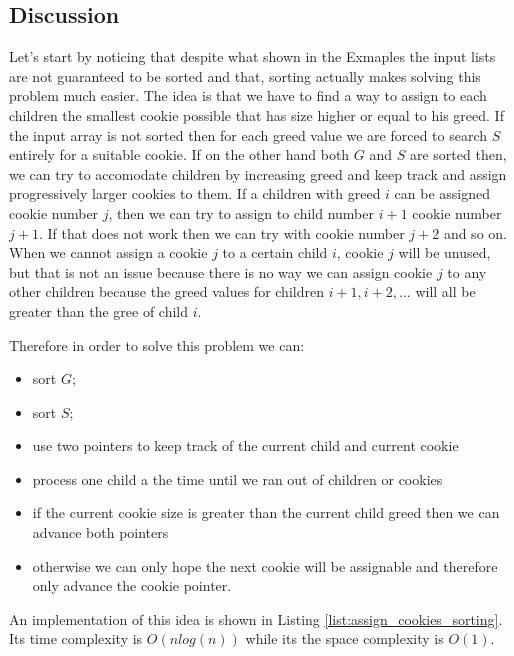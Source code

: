 \subsection{Discussion}
Let's start by noticing that despite what shown in the Exmaples the input lists are not guaranteed to be sorted and that, sorting actually makes solving this problem much easier.
The idea is that we have to find a way to assign to each children the smallest cookie possible that has size higher or equal to his greed. If the input array is not sorted then for each greed value we are forced to search $S$ entirely for a suitable cookie. 
If on the other hand both $G$ and $S$ are sorted then, we can try to accomodate children by increasing greed and keep track and assign progressively larger cookies to them. 
If a children with greed $i$ can be assigned cookie number $j$, then we can try to assign to child number $i+1$ cookie number $j+1$. If that does not work then we can try with cookie number $j+2$ and so on.
When we cannot assign a cookie $j$ to a certain child $i$, cookie $j$ will be unused, but that is not an issue because there is no way we can assign cookie $j$ to any other children because the greed values for children $i+1, i+2, \ldots$  will all be greater than the gree of child $i$.

Therefore in order to solve this problem we can:
\begin{itemize}
    \item sort $G$;
    \item sort $S$;
    \item use two pointers to keep track of the current child and current cookie
    \item process one child a the time until we ran out of children or cookies
    \item if the current cookie size is greater than the current child greed then we can advance both pointers
    \item otherwise we can only hope the next cookie will be assignable and therefore only advance the cookie pointer.
\end{itemize}

An implementation of this idea is shown in Listing \ref{list:assign_cookies_sorting}. Its time complexity is $O(nlog(n))$ while its the space complexity is $O(1)$.





